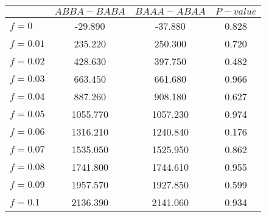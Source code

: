 \begin{tabular}{lccc}
\toprule
 & $ABBA-BABA$ & $BAAA-ABAA$ & $P-value$ \\
\midrule
$f = 0$ & -29.890 & -37.880 & 0.828 \\
$f = 0.01$ & 235.220 & 250.300 & 0.720 \\
$f = 0.02$ & 428.630 & 397.750 & 0.482 \\
$f = 0.03$ & 663.450 & 661.680 & 0.966 \\
$f = 0.04$ & 887.260 & 908.180 & 0.627 \\
$f = 0.05$ & 1055.770 & 1057.230 & 0.974 \\
$f = 0.06$ & 1316.210 & 1240.840 & 0.176 \\
$f = 0.07$ & 1535.050 & 1525.950 & 0.862 \\
$f = 0.08$ & 1741.800 & 1744.610 & 0.955 \\
$f = 0.09$ & 1957.570 & 1927.850 & 0.599 \\
$f = 0.1$ & 2136.390 & 2141.060 & 0.934 \\
\bottomrule
\end{tabular}
